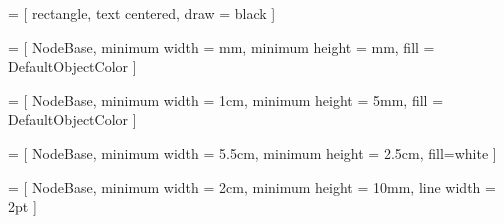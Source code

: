 \usepackage[
	textwidth  = 160mm, 
	textheight = 230mm, 
	top        = 25mm, 
	bottom     = 30mm
]{geometry}
\usepackage[normalem]{ulem}
\usepackage[utf8]{inputenc}
\usepackage[T1]{fontenc}
\usepackage[magyar]{babel}

\usepackage{
	amsmath,   %
	amsthm,    %
	amsfonts,  %
	paralist,  %
	multirow,  %
	float,     %
	tikz,      %
	tikz-uml,  %
	listings,  %
	subfiles,  %
	array      %
}
\usepackage[unicode]{hyperref} %

\usetikzlibrary{
	positioning, %
	calc,        %
	math         %
}


 = [
	rectangle,
	text centered,
	draw = black
]


 = [
	NodeBase,
	minimum width  = \stackNodeWidth mm, 
	minimum height = \stackNodeHeight mm,
	fill           = DefaultObjectColor
]

 = [
	NodeBase,
	minimum width  = 1cm, 
	minimum height = 5mm, 
	fill           = DefaultObjectColor
]

 = [
	NodeBase,
	minimum width  = 5.5cm, 
	minimum height = 2.5cm,
	fill=white
]

 = [
	NodeBase, 
	minimum width  = 2cm, 
	minimum height = 10mm, 
	line width     = 2pt
]

%
\newcommand{\drawStackFrame}[3]{
	\draw [thick, black] (#1, #2) -- (#1 + \stackNodeWidth/10, #2);
	\draw [thick, black] (#1, #2) -- (#1, #3);
	\draw [thick, black] (#1 + \stackNodeWidth/10, #2) -- (#1 + \stackNodeWidth/10, #3);
}

